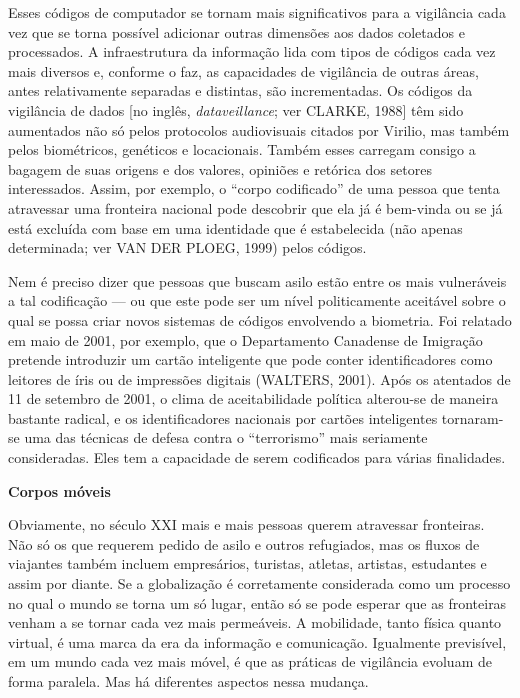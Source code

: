 Esses códigos de computador se tornam mais significativos para a
vigilância cada vez que se torna possível adicionar outras dimensões aos
dados coletados e processados. A infraestrutura da informação lida com
tipos de códigos cada vez mais diversos e, conforme o faz, as
capacidades de vigilância de outras áreas, antes relativamente separadas
e distintas, são incrementadas. Os códigos da vigilância de dados {[}no
inglês, \emph{dataveillance}; ver CLARKE, 1988{]} têm sido aumentados
não só pelos protocolos audiovisuais citados por Virilio, mas também
pelos biométricos, genéticos e locacionais. Também esses carregam
consigo a bagagem de suas origens e dos valores, opiniões e retórica dos
setores interessados. Assim, por exemplo, o ``corpo codificado'' de uma
pessoa que tenta atravessar uma fronteira nacional pode descobrir que
ela já é bem-vinda ou se já está excluída com base em uma identidade que
é estabelecida (não apenas determinada; ver VAN DER PLOEG, 1999) pelos
códigos.

Nem é preciso dizer que pessoas que buscam asilo estão entre os mais
vulneráveis a tal codificação --- ou que este pode ser um nível
politicamente aceitável sobre o qual se possa criar novos sistemas de
códigos envolvendo a biometria. Foi relatado em maio de 2001, por
exemplo, que o Departamento Canadense de Imigração pretende introduzir
um cartão inteligente que pode conter identificadores como leitores de
íris ou de impressões digitais (WALTERS, 2001). Após os atentados de 11
de setembro de 2001, o clima de aceitabilidade política alterou-se de
maneira bastante radical, e os identificadores nacionais por cartões
inteligentes tornaram-se uma das técnicas de defesa contra o
``terrorismo'' mais seriamente consideradas. Eles tem a capacidade de
serem codificados para várias finalidades.

\textbf{Corpos móveis}

Obviamente, no século XXI mais e mais pessoas querem atravessar
fronteiras. Não só os que requerem pedido de asilo e outros refugiados,
mas os fluxos de viajantes também incluem empresários, turistas,
atletas, artistas, estudantes e assim por diante. Se a globalização é
corretamente considerada como um processo no qual o mundo se torna um só
lugar, então só se pode esperar que as fronteiras venham a se tornar
cada vez mais permeáveis. A mobilidade, tanto física quanto virtual, é
uma marca da era da informação e comunicação. Igualmente previsível, em
um mundo cada vez mais móvel, é que as práticas de vigilância evoluam de
forma paralela. Mas há diferentes aspectos nessa mudança.

